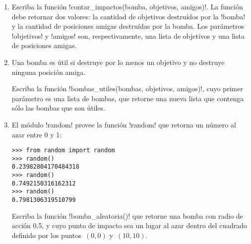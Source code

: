 \begin{enumerate}[leftmargin=0pt,label=\emph{\alph*})]

  \item
    Escriba la función \li!contar_impactos(bomba, objetivos, amigos)!.
    La función debe retornar dos valores:
    la cantidad de objetivos destruídos por la \li!bomba!
    y la cantidad de posiciones amigas destruídas por la bomba.
    Los parámetros \li!objetivos! y \li!amigos! son, respectivamente,
    una lista de objetivos y una lista de posiciones amigas.

  \item
    Una bomba es útil si destruye por lo menos un objetivo
    y no destruye ninguna posición amiga.

    Escriba la función \li!bombas_utiles(bombas, objetivos, amigos)!,
    cuyo primer parámetro es una lista de bombas,
    que retorne una nueva lista que contenga sólo las bombas que son útiles.

  \item
    El módulo \li!random! provee la función \li!random!
    que retorna un número al azar entre 0 y 1:
\begin{lstlisting}
>>> from random import random
>>> random()
0.23982804170484318
>>> random()
0.7492150316162312
>>> random()
0.7981306319510799
\end{lstlisting}
    Escriba la función \li!bomba_aleatoria()!
    que retorne una bomba con radio de acción 0.5,
    y cuyo punto de impacto sea un lugar al azar
    dentro del cuadrado definido por los puntos~\((0, 0)\) y~\((10, 10)\).

\end{enumerate}

